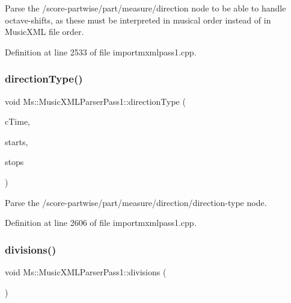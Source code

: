 Parse the /score-\/partwise/part/measure/direction node to be able to handle octave-\/shifts, as these must be interpreted in musical order instead of in Music\+X\+ML file order. 

Definition at line 2533 of file importmxmlpass1.\+cpp.

\mbox{\label{class_ms_1_1_music_x_m_l_parser_pass1_a67b9401bb4719c4ee6b760f31e2282e8}} 
\subsubsection{\texorpdfstring{direction\+Type()}{directionType()}}
{\footnotesize\ttfamily void Ms\+::\+Music\+X\+M\+L\+Parser\+Pass1\+::direction\+Type (\begin{DoxyParamCaption}\item[{const \hyperlink{class_ms_1_1_fraction}{Fraction}}]{c\+Time,  }\item[{Q\+List$<$ \hyperlink{struct_ms_1_1_mxml_octave_shift_desc}{Mxml\+Octave\+Shift\+Desc} $>$ \&}]{starts,  }\item[{Q\+List$<$ \hyperlink{struct_ms_1_1_mxml_octave_shift_desc}{Mxml\+Octave\+Shift\+Desc} $>$ \&}]{stops }\end{DoxyParamCaption})}

Parse the /score-\/partwise/part/measure/direction/direction-\/type node. 

Definition at line 2606 of file importmxmlpass1.\+cpp.

\mbox{\label{class_ms_1_1_music_x_m_l_parser_pass1_a9f1903385cb6f43c9aab41891125ed17}} 
\subsubsection{\texorpdfstring{divisions()}{divisions()}}
{\footnotesize\ttfamily void Ms\+::\+Music\+X\+M\+L\+Parser\+Pass1\+::divisions (\begin{DoxyParamCaption}{ }\end{DoxyParamCaption})}

